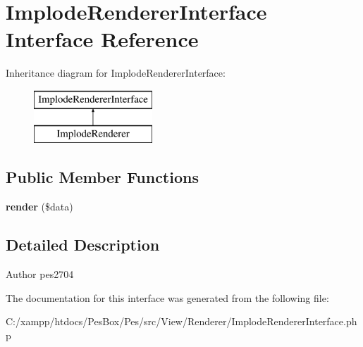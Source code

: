 \hypertarget{interface_pes_1_1_view_1_1_renderer_1_1_implode_renderer_interface}{}\section{Implode\+Renderer\+Interface Interface Reference}
\label{interface_pes_1_1_view_1_1_renderer_1_1_implode_renderer_interface}
Inheritance diagram for Implode\+Renderer\+Interface\+:\begin{figure}[H]
\begin{center}
\leavevmode
\includegraphics[height=2.000000cm]{interface_pes_1_1_view_1_1_renderer_1_1_implode_renderer_interface}
\end{center}
\end{figure}
\subsection*{Public Member Functions}
\begin{DoxyCompactItemize}
\item 
\mbox{\label{interface_pes_1_1_view_1_1_renderer_1_1_implode_renderer_interface_a4e668eb23e20275367736c0243da1749}} 
{\bfseries render} (\$data)
\end{DoxyCompactItemize}


\subsection{Detailed Description}
\begin{DoxyAuthor}{Author}
pes2704 
\end{DoxyAuthor}


The documentation for this interface was generated from the following file\+:\begin{DoxyCompactItemize}
\item 
C\+:/xampp/htdocs/\+Pes\+Box/\+Pes/src/\+View/\+Renderer/Implode\+Renderer\+Interface.\+php\end{DoxyCompactItemize}
